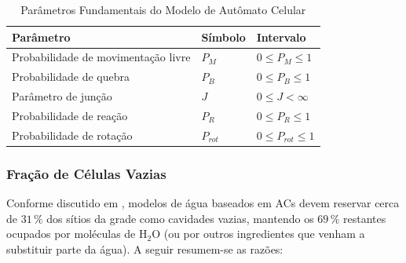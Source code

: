 \documentclass[12pt,oneside]{report}
\begin{document}
\begin{table}[H]
    \centering
    \caption{Parâmetros Fundamentais do Modelo de Autômato Celular}
    \vspace{0.2cm}
    \begin{tabularx}{\textwidth}{X m{3cm} m{3cm}}
        \hline
        \textbf{Parâmetro}                  & \textbf{Símbolo} & \textbf{Intervalo}      \\
        \hline
        Probabilidade de movimentação livre & $P_M$            & $0 \leq P_M \leq 1$     \\
        Probabilidade de quebra             & $P_B$            & $0 \leq P_B \leq 1$     \\
        Parâmetro de junção                 & $J$              & $0 \leq J < \infty$     \\
        Probabilidade de reação             & $P_R$            & $0 \leq P_R \leq 1$     \\
        Probabilidade de rotação            & $P_{rot}$        & $0 \leq P_{rot} \leq 1$ \\
        \hline
    \end{tabularx}

    \vspace{0.2cm}
\end{table}

\subsubsection{Fração de Células Vazias}
\label{subsubsec:fracao_celulas_vazias}

Conforme discutido em \citeauthor*{kier2005}, modelos de água baseados em ACs devem reservar cerca de $31\,\%$ dos sítios da grade como
cavidades vazias, mantendo os $69\,\%$ restantes ocupados por moléculas de
H$_2$O (ou por outros ingredientes que venham a substituir parte da água).
A seguir resumem-se as razões:
\end{document}
